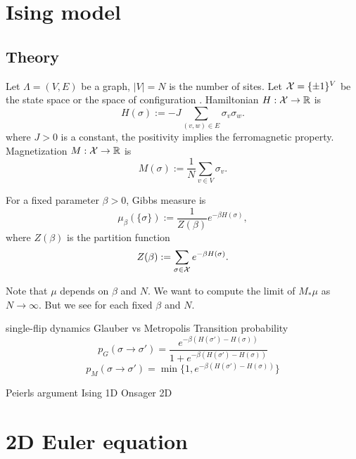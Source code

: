 \documentclass[a4paper]{report}
\begin{document}
\chapter*{Ising model}
\section{Theory}
Let $\Lambda=(V,E)$ be a graph, $|V|=N$ is the number of sites.
Let $\mathcal{X}=\{\pm1\}^V$ be the state space or the space of configuration .
Hamiltonian $H:\mathcal{X}\to\mathbb{R}$ is
\[H(\sigma):=-J\sum_{(v,w)\in E}\sigma_v\sigma_w.\]
where $J>0$ is a constant, the positivity implies the ferromagnetic property.
Magnetization $M:\mathcal{X}\to\mathbb{R}$ is
\[M(\sigma):=\frac1N\sum_{v\in V}\sigma_v.\]

For a fixed parameter $\beta>0$,
Gibbs measure is
\[\mu_\beta(\{\sigma\}):=\frac1{Z(\beta)}e^{-\beta H(\sigma)},\]
where $Z(\beta)$ is the partition function
\[Z(\beta):=\sum_{\sigma\in\mathcal{X}}e^{-\beta H(\sigma)}.\]


Note that $\mu$ depends on $\beta$ and $N$.
We want to compute the limit of $M_*\mu$ as $N\to\infty$.
But we see for each fixed $\beta$ and $N$.


single-flip dynamics
Glauber vs Metropolis
Transition probability
\[p_G(\sigma\to\sigma')=\frac{e^{-\beta(H(\sigma')-H(\sigma))}}{1+e^{-\beta(H(\sigma')-H(\sigma))}}\]
\[p_M(\sigma\to\sigma')=\min\{1,e^{-\beta(H(\sigma')-H(\sigma))}\}\]


Peierls argument
Ising 1D
Onsager 2D



\chapter*{2D Euler equation}
\end{document}
